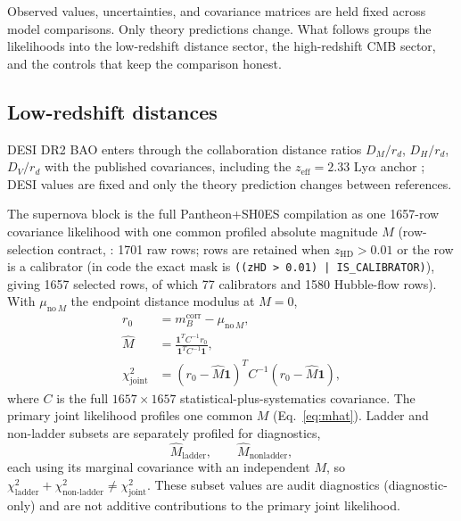 \label{sec:data}

Observed values, uncertainties, and covariance matrices are held fixed
across model comparisons. Only theory
predictions change. What follows groups the likelihoods into the
low-redshift distance sector, the high-redshift CMB sector, and the
controls that keep the comparison honest.

\subsection{Low-redshift distances}

DESI DR2 BAO \citep{DESIDR2} enters through the collaboration
distance ratios $D_{M}/r_{d}$, $D_{H}/r_{d}$, $D_{V}/r_{d}$ with the
published covariances, including the $z_{\mathrm{eff}}=2.33$ Ly$\alpha$ anchor \citep{DESIDR2Lya}; DESI values are fixed and only the theory
prediction changes between references.

The supernova block is the full Pantheon+SH0ES compilation
\citep{Scolnic2022,Brout2022,Riess2022} as one 1657-row covariance likelihood
with one common profiled absolute magnitude $M$ (row-selection contract,
: 1701 raw rows;
rows are retained when $z_{\mathrm{HD}}>0.01$ or the row is a calibrator (in code the exact mask is \texttt{((zHD > 0.01) | IS\_CALIBRATOR)}), giving 1657 selected rows,
of which 77 calibrators and 1580 Hubble-flow rows). With
$\mu_{\mathrm{no}\,M}$ the endpoint distance modulus at $M=0$,
\begin{align}
  r_{0} &= m_{B}^{\mathrm{corr}} - \mu_{\mathrm{no}\,M},
  \label{eq:r0} \\
  \hat{M} &= \frac{\mathbf{1}^{T}C^{-1}r_{0}}
                  {\mathbf{1}^{T}C^{-1}\mathbf{1}},
  \label{eq:mhat} \\
  \chi^{2}_{\mathrm{joint}}
    &= (r_{0}-\hat{M}\mathbf{1})^{T}C^{-1}(r_{0}-\hat{M}\mathbf{1}),
  \label{eq:chijoint}
\end{align}
where $C$ is the full $1657\times1657$ statistical-plus-systematics
covariance. The primary joint likelihood profiles one common $M$
(Eq.~\eqref{eq:mhat}). Ladder and non-ladder subsets are separately
profiled for diagnostics,
\begin{equation}
  \hat{M}_{\mathrm{ladder}},\qquad \hat{M}_{\mathrm{nonladder}},
  \label{eq:msubset}
\end{equation}
each using its marginal covariance with an independent $M$, so
$\chi^{2}_{\mathrm{ladder}}+\chi^{2}_{\mathrm{non\text{-}ladder}}
\neq \chi^{2}_{\mathrm{joint}}$.
These subset values are audit diagnostics (diagnostic-only) and are
not additive contributions to the primary joint likelihood.

